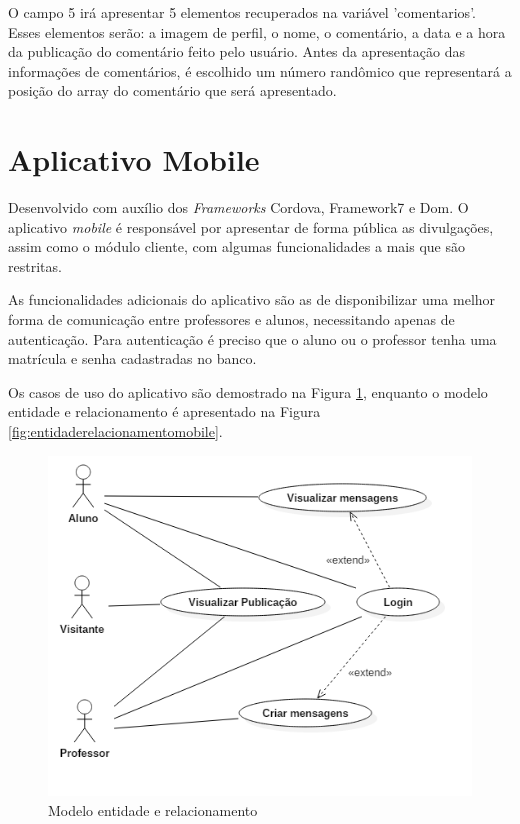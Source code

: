 O campo 5 irá apresentar 5 elementos recuperados na variável 'comentarios'. Esses elementos serão: a imagem de perfil, o nome, o comentário, a data e a hora da publicação do comentário feito pelo usuário. Antes da apresentação das informações de comentários, é escolhido um número randômico que representará a posição do array do comentário que será apresentado.

\section{Aplicativo Mobile}
Desenvolvido com auxílio dos \textit{Frameworks} Cordova, Framework7 e Dom. O aplicativo \textit{mobile} é responsável por apresentar de forma pública as divulgações, assim como o módulo cliente, com algumas funcionalidades a mais que são restritas.

As funcionalidades adicionais do aplicativo são as de disponibilizar uma melhor forma de comunicação entre professores e alunos, necessitando apenas de autenticação. Para autenticação é preciso que o aluno ou o professor tenha uma matrícula e senha cadastradas no banco.

Os casos de uso do aplicativo são demostrado na Figura \ref{fig:casosdeusomobile}, enquanto o modelo entidade e relacionamento é apresentado na Figura \ref{fig:entidaderelacionamentomobile}.
\begin{figure}[H]
\centering
\includegraphics[scale=0.4]{figuras/CasosDeUsoMobile}
\caption{Modelo entidade e relacionamento}
\label{fig:casosdeusomobile}
\end{figure}

